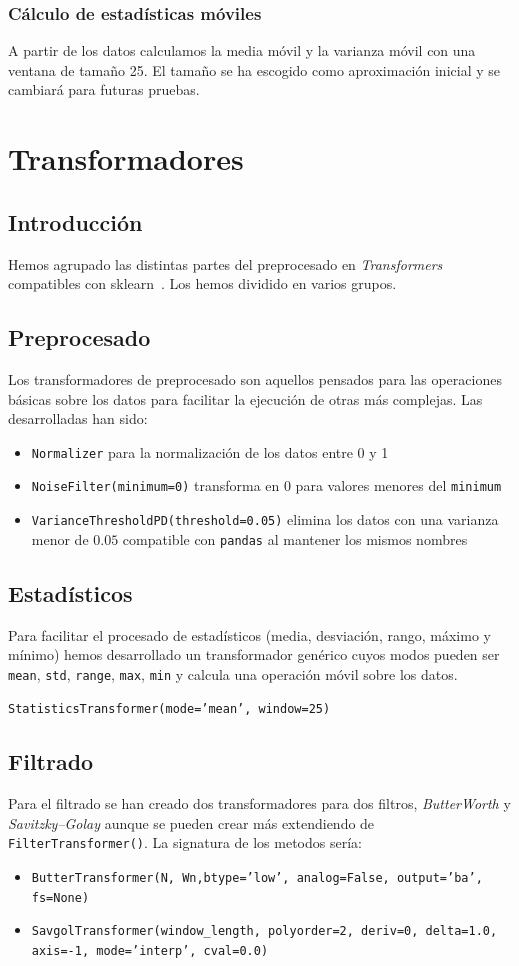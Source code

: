 \documentclass[a4paper,12pt,twoside,oldfontcommands]{memoir}
\begin{document}
\subsection{Cálculo de estadísticas móviles}
A partir de los datos calculamos la media móvil y la varianza móvil con una ventana de tamaño 25. El tamaño se ha escogido como aproximación inicial y se cambiará para futuras pruebas. 

\chapter{Transformadores}
\section{Introducción}
Hemos agrupado las distintas partes del preprocesado en \textit{Transformers} compatibles con sklearn~\cite{dreisbach_2015}. Los hemos dividido en varios grupos.
\section{Preprocesado}
Los transformadores de preprocesado son aquellos pensados para las operaciones básicas sobre los datos para facilitar la ejecución de otras más complejas. Las desarrolladas han sido:
\begin{itemize}
\item \texttt{Normalizer} para la normalización de los datos entre 0 y 1
\item \texttt{NoiseFilter(minimum=0)} transforma en 0 para valores menores del \texttt{minimum}
\item \texttt{VarianceThresholdPD(threshold=0.05)} elimina los datos con una varianza menor de \(0.05\) compatible con \texttt{pandas} al mantener los mismos nombres
\end{itemize}
\section{Estadísticos}
Para facilitar el procesado de estadísticos (media, desviación, rango, máximo y mínimo) hemos desarrollado un transformador genérico cuyos modos pueden ser \texttt{mean}, \texttt{std}, \texttt{range}, \texttt{max}, \texttt{min} y calcula una operación móvil sobre los datos. 

\texttt{StatisticsTransformer(mode='mean', window=25)}
\section{Filtrado}
Para el filtrado se han creado dos transformadores para dos filtros, \textit{ButterWorth} y \textit{Savitzky–Golay} aunque se pueden crear más extendiendo de \texttt{FilterTransformer()}. La signatura de los metodos sería:
\begin{itemize}
\item \texttt{ButterTransformer(N, Wn,btype='low', analog=False, output='ba', fs=None)}
\item \texttt{SavgolTransformer(window\_length, polyorder=2, deriv=0, delta=1.0, axis=-1, mode='interp', cval=0.0)}
\end{itemize}
\end{document}
